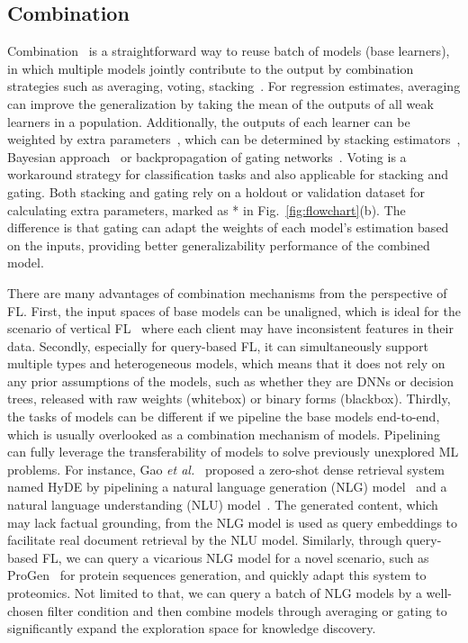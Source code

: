 \subsection{Combination}
\label{sec:combination}
Combination~\cite{zhou2012ensemble} is a straightforward way to reuse batch of models (base learners), in which multiple models jointly contribute to the output by combination strategies such as averaging, voting, stacking~\cite{jacobs1991adaptive, wolpert1992stacked}.
For regression estimates, averaging can improve the generalization by taking the mean of the outputs of all weak learners in a population. Additionally, the outputs of each learner can be weighted by extra parameters~\cite{perrone1995networks}, which can be determined by stacking estimators~\cite{wolpert1992stacked}, Bayesian approach~\cite{clarke2003comparing} or backpropagation of gating networks~\cite{jacobs1991adaptive}. 
Voting is a workaround strategy for classification tasks and also applicable for stacking and gating.
Both stacking and gating rely on a holdout or validation dataset for calculating extra parameters, marked as * in Fig.~\ref{fig:flowchart}(b). 
The difference is that gating can adapt the weights of each model's estimation based on the inputs, providing better generalizability performance of the combined model.

There are many advantages of combination mechanisms from the perspective of FL.
First, the input spaces of base models can be unaligned, which is ideal for the scenario of vertical FL~\cite{wu2022practical} where each client may have inconsistent features in their data.
Secondly, especially for query-based FL, it can simultaneously support multiple types and heterogeneous models, which means that it does not rely on any prior assumptions of the models, such as whether they are DNNs or decision trees, released with raw weights (whitebox) or binary forms (blackbox).
Thirdly, the tasks of models can be different if we pipeline the base models end-to-end, which is usually overlooked as a combination mechanism of models. 
Pipelining can fully leverage the transferability of models to solve previously unexplored ML problems.
For instance, Gao \textit{et al.}~\cite{gao2022precise} proposed a zero-shot dense retrieval system named HyDE by pipelining a natural language generation (NLG) model~\cite{ouyang2022training} and a natural language understanding (NLU) model~\cite{izacard2022unsupervised}.
The generated content, which may lack factual grounding, from the NLG model is used as query embeddings to facilitate real document retrieval by the NLU model.
Similarly, through query-based FL, we can query a vicarious NLG model for a novel scenario, such as ProGen~\cite{madani2023large} for protein sequences generation, and quickly adapt this system to proteomics.
Not limited to that, we can query a batch of NLG models by a well-chosen filter condition and then combine models through averaging or gating to significantly expand the exploration space for knowledge discovery.

